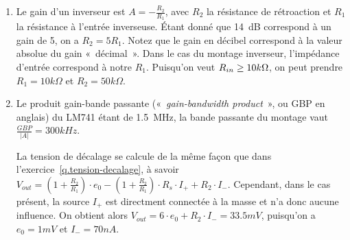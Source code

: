 \documentclass{../template/tp}
\begin{document}
{
	\begin{enumerate}
		\item Le gain d'un inverseur est $A = -\frac{R_2}{R_1}$, avec $R_2$ la résistance de rétroaction et $R_1$ la résistance à l'entrée inverseuse.
		Étant donné que 14~dB correspond à un gain de 5, on a $R_2 = 5 R_1$. Notez que le gain en décibel correspond à la valeur absolue du gain «~décimal~».
		Dans le cas du montage inverseur, l'impédance d'entrée correspond à notre $R_1$.
		Puisqu'on veut $R_{in} \geq 10 k\ohm$, on peut prendre $R_1 = 10 k\Omega$ et $R_2 = 50 k\Omega$.

		\item Le produit gain-bande passante («~\textit{gain-bandwidth product}~», ou GBP en anglais) du LM741 étant de 1.5~MHz, la bande passante du montage vaut $\frac{GBP}{|A|} = 300 kHz$.

		La tension de décalage se calcule de la même façon que dans l'exercice~\ref{q.tension-decalage}, à savoir $V_{out} = (1+\frac{R_2}{R_1})\cdot e_0 -(1+\frac{R_2}{R_1}) \cdot R_s \cdot I_+ + R_2 \cdot I_-$.
		Cependant, dans le cas présent, la source $I_+$ est directment connectée à la masse et n'a donc aucune influence.
		On obtient alors $V_{out} = 6\cdot e_0 + R_2 \cdot I_- = 33.5 mV$, puisqu'on a $e_0 = 1mV$ et $I_- = 70nA$.
	\end{enumerate}
}
\end{document}
